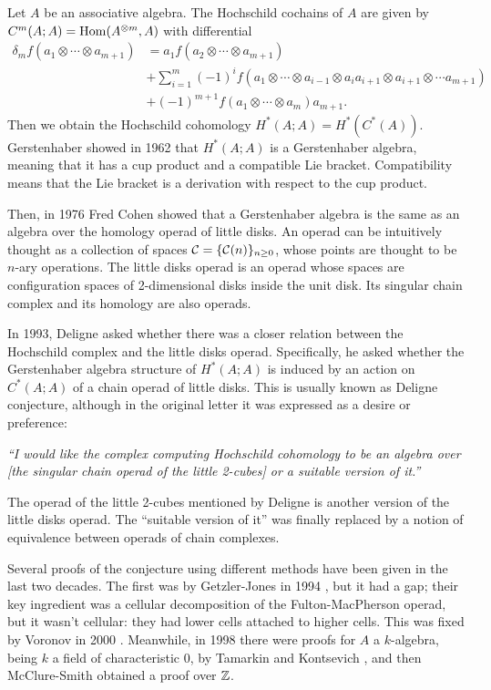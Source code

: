 \documentclass[TFM.tex]{subfiles}
\begin{document}

Let $A$ be an associative algebra. The Hochschild cochains of $A$ are given by $C^m(A;A)=\operatorname{Hom}(A^{\otimes m},A)$ with differential 
\begin{align*}
\delta_m f(a_1\otimes\cdots\otimes a_{m+1})&=a_1f(a_2\otimes\cdots\otimes a_{m+1})\\
& +\sum_{i=1}^m(-1)^if(a_1\otimes\cdots\otimes a_{i-1}\otimes a_ia_{i+1}\otimes a_{i+1}\otimes\cdots a_{m+1})\\
& +(-1)^{m+1}f(a_1\otimes\cdots\otimes a_m)a_{m+1}.
\end{align*}
Then we obtain the Hochschild cohomology $H^*(A;A)=H^*(C^*(A))$. Gerstenhaber showed in 1962 \cite{Gerstenhaber} that $H^*(A;A)$ is a Gerstenhaber algebra, meaning that it has a cup product and a compatible Lie bracket. Compatibility means that the Lie bracket is a derivation with respect to the cup product.

Then, in 1976 Fred Cohen \cite{cuentas} showed that a Gerstenhaber algebra is the same as an algebra over the homology operad of little disks. An operad can be intuitively thought as a collection of spaces $\mathcal{C}=\{\mathcal{C}(n)\}_{n\geq 0}$, whose points are thought to be $n$-ary operations. The little disks operad is an operad whose spaces are configuration spaces of 2-dimensional disks inside the unit disk. Its singular chain complex and its homology are also operads. 

In 1993, Deligne asked \cite{deligne} whether there was a closer relation between the Hochschild complex and the little disks operad. Specifically, he asked whether the Gerstenhaber algebra structure of $H^*(A;A)$ is induced by an action on $C^*(A;A)$ of a chain operad of little disks. This is usually known as Deligne conjecture, although in the original letter it was expressed as a desire or preference:

\emph{``I would
like the complex computing Hochschild cohomology to be an algebra over [the singular chain
operad of the little 2-cubes] or a suitable version of it.''}

The operad of the little 2-cubes mentioned by Deligne is another version of the little disks operad. The ``suitable version of it'' was finally replaced by a notion of equivalence between operads of chain complexes.

Several proofs of the conjecture using different methods have been given in the last two decades. The first was by Getzler-Jones in 1994 \cite{GJ}, but it had a gap; their key ingredient was a cellular decomposition of the Fulton-MacPherson operad, but it wasn’t cellular: they had
lower cells attached to higher cells. This was fixed by Voronov in 2000 \cite{VO}. Meanwhile, in 1998 there were proofs for $A$ a $k$-algebra, being $k$ a field of characteristic 0, by Tamarkin and Kontsevich \cite{tk}, and then McClure-Smith \cite{McClure} obtained a proof over $\mathbb{Z}$.
\end{document}
